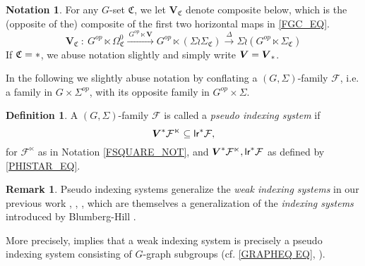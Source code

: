 \documentclass[a4paper,10pt
,draft
]{article}%
\numberwithin{equation}{section}
\numberwithin{figure}{section}
\theoremstyle{definition} %
\newtheorem{definition}[equation]{Definition}%
\newtheorem{remark}[equation]{Remark}%
\newtheorem{notation}[equation]{Notation}%
\newcommand{\F}{\ensuremath{\mathcal F}}
\newcommand{\1}{\ensuremath{\mathbbm 1}}%
\begin{document}
   

\begin{notation}
For any $G$-set $\mathfrak C$, we let $\boldsymbol{V}_{\mathfrak C}$ denote composite below, which is 
the (opposite of the) composite of the first two horizontal maps in \eqref{FGC_EQ}.
\begin{equation}\label{VC_EQ}
	\boldsymbol{V}_{\mathfrak{C}} \ \colon \ 
	G^{op} \ltimes \Omega_{\mathfrak{C}}^{0}
	\xrightarrow{\ G^{op} \ltimes \boldsymbol{V} \ }
	G^{op} \ltimes \left(\Sigma \wr \Sigma_{\mathfrak{C}}\right)
	\xrightarrow{\ \Delta \ }
	\Sigma \wr  \left(G^{op} \ltimes \Sigma_{\mathfrak{C}} \right)
\end{equation}
If $\mathfrak C = \**$, we abuse notation slightly and simply write $\boldsymbol{V} = \boldsymbol{V}_{\**}$. 
\end{notation}


In the following 
we slightly abuse notation by conflating
a $(G,\Sigma)$-family $\F$,
i.e. a family in $G \times \Sigma^{op}$,
with its opposite family
in $G^{op} \times \Sigma$.


\begin{definition}\label{PIS_DEF}
	A $(G,\Sigma)$-family $\F$ is called a \textit{pseudo indexing system} if
\begin{equation}\label{PIS_EQ}
	\boldsymbol{V}^{\**} \F^\ltimes \subseteq \mathsf{lr}^{\**}\F,
\end{equation}
for $\F^\ltimes$ as in Notation \ref{FSQUARE_NOT},
and
$\boldsymbol{V}^{\**} \F^\ltimes, \mathsf{lr}^{\**}\F$
as defined by \eqref{PHISTAR_EQ}.
\end{definition}



\begin{remark}
	Pseudo indexing systems generalize the
	\textit{weak indexing systems} in our previous work
	\cite[Def. 9.5]{Per18}, \cite[Def. 4.58]{BP_geo}, \cite[Def. 6.2]{BP_edss},
	which are themselves a generalization of the 
	\textit{indexing systems} introduced by Blumberg-Hill \cite[Def. 3.22]{BH15}.
	
	More precisely, \cite[Rem. 6.47]{BP_geo} implies that
        a weak indexing system is precisely a pseudo indexing system consisting of $G$-graph subgroups (cf. \eqref{GRAPHEQ EQ}, \cite[Def. 6.36]{BP_geo}).
\end{remark}
\end{document}
